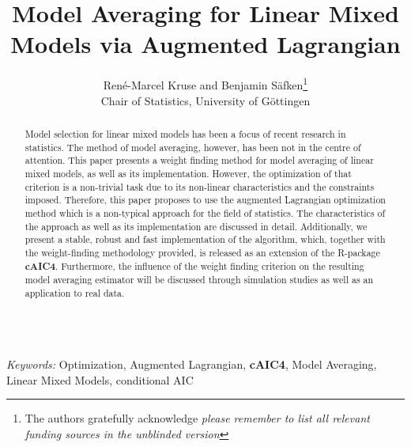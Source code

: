 \begin{titlepage}

      \title{\bf Model Averaging for Linear Mixed Models via Augmented Lagrangian}
      \author{Ren\'e-Marcel Kruse and Benjamin S\"afken\thanks{
        The authors gratefully acknowledge \textit{please remember to list all relevant funding sources in the unblinded version}}\hspace{.2cm}\\
        Chair of Statistics, University of G\"ottingen\\}
      \maketitle
    
    
    \bigskip
    \begin{abstract}
    Model selection for linear mixed models has been a focus of recent research in statistics. The method of model averaging, however, has been not in the centre of attention. This paper presents a weight finding method for model averaging of linear mixed models, as well as its implementation. However, the optimization of that criterion is a non-trivial task due to its non-linear characteristics and the constraints imposed. Therefore, this paper proposes to use the augmented Lagrangian optimization method which is a non-typical approach for the field of statistics. The characteristics of the approach as well as its implementation are discussed in detail. Additionally, we present a stable, robust and fast implementation of the algorithm, which, together with the weight-finding methodology provided, is released as an extension of the R-package \textbf{cAIC4}. Furthermore, the influence of the weight finding criterion on the resulting model averaging estimator will be discussed through simulation studies as well as an application to real data.
    \\
    \\
    \end{abstract}
    
    \noindent%
    {\it Keywords:} Optimization, Augmented Lagrangian, \textbf{cAIC4}, Model Averaging, Linear Mixed Models, conditional AIC
    \\
    \vfill
    \end{titlepage}